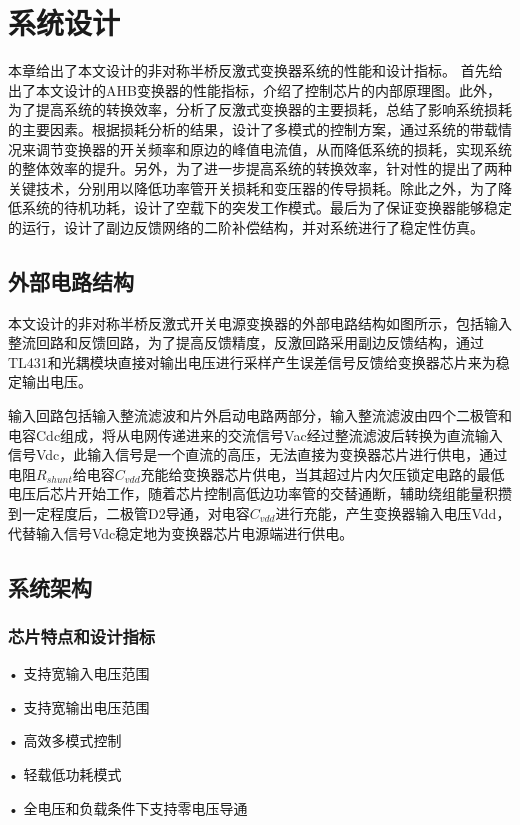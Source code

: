 \chapter{系统设计}
本章给出了本文设计的非对称半桥反激式变换器系统的性能和设计指标。 首先给出了本文设计的AHB变换器的性能指标，介绍了控制芯片的内部原理图。此外， 为了提高系统的转换效率，分析了反激式变换器的主要损耗，总结了影响系统损耗的主要因素。根据损耗分析的结果，设计了多模式的控制方案，通过系统的带载情况来调节变换器的开关频率和原边的峰值电流值，从而降低系统的损耗，实现系统的整体效率的提升。另外，为了进一步提高系统的转换效率，针对性的提出了两种关键技术，分别用以降低功率管开关损耗和变压器的传导损耗。除此之外，为了降低系统的待机功耗，设计了空载下的突发工作模式。最后为了保证变换器能够稳定的运行，设计了副边反馈网络的二阶补偿结构，并对系统进行了稳定性仿真。


\section{外部电路结构}
本文设计的非对称半桥反激式开关电源变换器的外部电路结构如图所示，包括输入整流回路和反馈回路，为了提高反馈精度，反激回路采用副边反馈结构，通过TL431和光耦模块直接对输出电压进行采样产生误差信号反馈给变换器芯片来为稳定输出电压。

输入回路包括输入整流滤波和片外启动电路两部分，输入整流滤波由四个二极管和电容Cdc组成，将从电网传递进来的交流信号Vac经过整流滤波后转换为直流输入信号Vdc，此输入信号是一个直流的高压，无法直接为变换器芯片进行供电，通过电阻$R_{shunt}$给电容$C_{vdd}$充能给变换器芯片供电，当其超过片内欠压锁定电路的最低电压后芯片开始工作，随着芯片控制高低边功率管的交替通断，辅助绕组能量积攒到一定程度后，二极管D2导通，对电容$C_{vdd}$进行充能，产生变换器输入电压Vdd，代替输入信号Vdc稳定地为变换器芯片电源端进行供电。


\section{系统架构}

\subsection{芯片特点和设计指标}

• 支持宽输入电压范围

• 支持宽输出电压范围

• 高效多模式控制

• 轻载低功耗模式

• 全电压和负载条件下支持零电压导通

